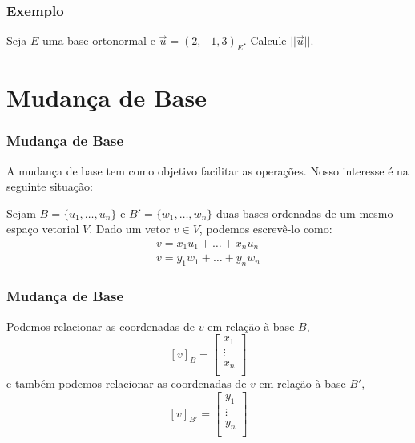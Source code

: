 \documentclass[hyperref={pdfpagelabels=false}]{beamer}
\begin{document}
\begin{frame}
\frametitle{Exemplo}

Seja $E$ uma base ortonormal e $\overrightarrow{u} = (2,-1,3)_E$. Calcule $||\overrightarrow{u}||$.

\end{frame}

\section{Mudança de Base}

\begin{frame}
\frametitle{Mudança de Base}

A mudança de base tem como objetivo facilitar as operações.
Nosso interesse é na seguinte situação:

Sejam $B = \{ u_1, \dots, u_n \}$ e $B' = \{ w_1, \dots, w_n \}$ duas bases ordenadas de um mesmo espaço vetorial $V$. Dado um vetor $v \in V$, podemos escrevê-lo como:
\begin{eqnarray}
v = x_1 u_1 + \dots + x_n u_n \\\label{eq00}
v = y_1 w_1 + \dots + y_n w_n 
\end{eqnarray}

\end{frame}

\begin{frame}
	\frametitle{Mudança de Base}
	
	Podemos relacionar as coordenadas de $v$ em relação à base $B$,
	$$[v]_B = \left[
	\begin{array}{c}
	x_1	\\
	\vdots	\\
	x_n \\
	\end{array}
	\right]$$
	e também podemos relacionar as coordenadas de $v$ em relação à base $B'$,
	$$[v]_{B'} = \left[
	\begin{array}{c}
	y_1	\\
	\vdots	\\
	y_n \\
	\end{array}
	\right]$$
\end{frame}
\end{document}
